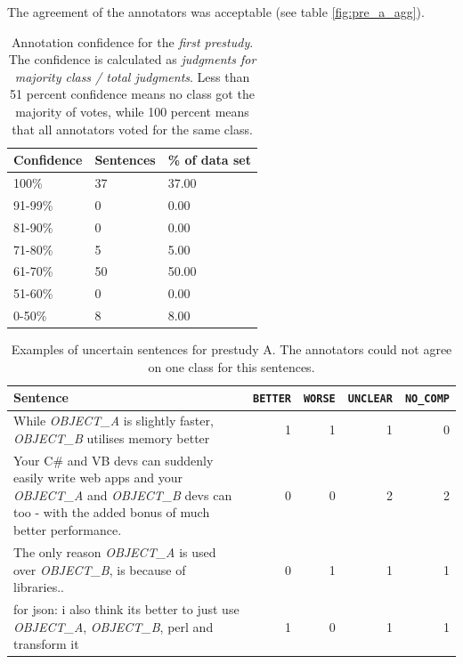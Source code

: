 The agreement of the annotators was acceptable (see table \ref{fig:pre_a_agg}).

\begin{table}[h]
\caption{Annotation confidence for the \emph{first prestudy}. The confidence is calculated as \emph{judgments for majority class / total judgments}. Less than 51 percent confidence means no class got the majority of votes, while 100 percent means that all annotators voted for the same class.}
\label{fig:pre_b_agg}
\begin{tabularx}{\textwidth}{XXX}
\toprule
Confidence & Sentences & \% of data set \\
\midrule
100\%	&	37	&	37.00	 \\ 
91-99\%	&	0	&	0.00	 \\ 
81-90\%	&	0	&	0.00	 \\ 
71-80\%	&	5	&	5.00	 \\ 
61-70\%	&	50	&	50.00	 \\ 
51-60\%	&	0	&	0.00	 \\ 
0-50\%	&	8	&	8.00	 \\ 
\bottomrule
\end{tabularx}
\end{table}


\begin{table}[h]
\centering
\caption{Examples of uncertain sentences for prestudy A. The annotators could not agree on one class for this sentences. }
\label{tbl:pre_1_res}
\begin{tabularx}{\textwidth}{Xrrrr}
\toprule
 Sentence        & \texttt{BETTER} & \texttt{WORSE} & \texttt{UNCLEAR} & \texttt{NO\_COMP}          \\ \midrule

While \emph{OBJECT\_A} is slightly faster, \emph{OBJECT\_B} utilises memory better & 1 & 1 & 1 & 0 \\

Your C\# and VB devs can suddenly easily write web apps and your \emph{OBJECT\_A} and \emph{OBJECT\_B} devs can too - with the added bonus of much better performance. & 0 & 0 & 2 & 2 \\

The only reason \emph{OBJECT\_A} is used over \emph{OBJECT\_B}, is because of libraries.. & 0 & 1 & 1 & 1 \\

for json: i also think its better to just use \emph{OBJECT\_A}, \emph{OBJECT\_B}, perl and transform it & 1 & 0 & 1 & 1 \\

\bottomrule                              
\end{tabularx}
\end{table}

